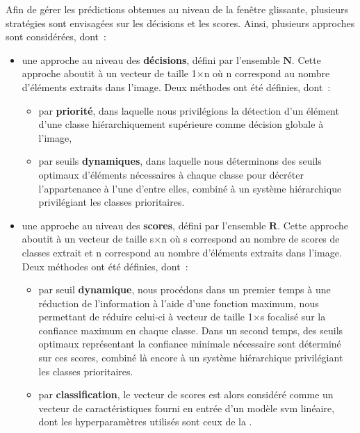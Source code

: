Afin de gérer les prédictions obtenues au niveau de la fenêtre glissante, plusieurs stratégies sont envisagées sur les décisions et les scores. Ainsi, plusieurs approches sont considérées, dont~:
\begin{itemize}
    \item   une approche au niveau des \textbf{décisions}, défini par l'ensemble $\mathbf{N}$. Cette approche aboutit à un vecteur de taille 1$\times$n où n correspond au nombre d'éléments extraits dans l'image. Deux méthodes ont été définies, dont~: 
            \begin{itemize}
                \item par \textbf{priorité}, dans laquelle nous privilégions la détection d'un élément d'une classe hiérarchiquement supérieure comme décision globale à l'image,
                \item par seuils \textbf{dynamiques}, dans laquelle nous déterminons des seuils optimaux d'éléments nécessaires à chaque classe pour décréter l'appartenance à l'une d'entre elles, combiné à un système hiérarchique privilégiant les classes prioritaires.
            \end{itemize}
    \item   une approche au niveau des \textbf{scores}, défini par l'ensemble $\mathbf{R}$. Cette approche aboutit à un vecteur de taille s$\times$n où s correspond au nombre de scores de classes extrait et n correspond au nombre d'éléments extraits dans l'image. Deux méthodes ont été définies, dont~: 
            \begin{itemize}
                \item par seuil \textbf{dynamique}, nous procédons dans un premier temps à une réduction de l'information à l'aide d'une fonction maximum, nous permettant de réduire celui-ci à vecteur de taille 1$\times$s focalisé sur la confiance maximum en chaque classe. Dans un second temps, des seuils optimaux représentant la confiance minimale nécessaire sont déterminé sur ces scores, combiné là encore à un système hiérarchique privilégiant les classes prioritaires.
                \item par \textbf{classification}, le vecteur de scores est alors considéré comme un vecteur de caractéristiques fourni en entrée d'un modèle \gls{svm} linéaire, dont les hyperparamètres utilisés sont ceux de la .
            \end{itemize}
\end{itemize}\par

